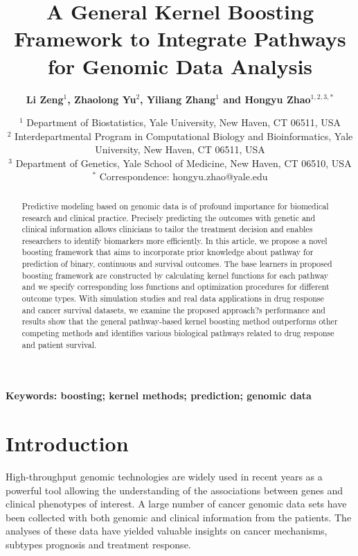 \documentclass[a4paper,12pt]{article}
\begin{document}
	\title{\bf A General Kernel Boosting Framework to Integrate Pathways for Genomic Data Analysis}
	\author{\bf Li Zeng$^{1}$, Zhaolong Yu$^2$, Yiliang Zhang$^1$ and Hongyu Zhao$^{1,2,3,*}$}
	\date{
		$^1$ Department of Biostatistics, Yale University, New Haven, CT 06511, USA\\
	$^2$ Interdepartmental Program in Computational Biology and Bioinformatics, Yale University, New Haven, CT 06511, USA\\
	$^3$ Department of Genetics, Yale School of Medicine, New Haven, CT 06510, USA\\
	$^*$ Correspondence: hongyu.zhao@yale.edu
}
	\maketitle
	\begin{abstract}
	Predictive modeling based on genomic data is of profound importance for biomedical research and clinical practice. Precisely predicting the outcomes with genetic and clinical information allows clinicians to tailor the treatment decision and enables researchers to identify biomarkers more efficiently. In this article, we propose a novel boosting framework that aims to incorporate prior knowledge about pathway for prediction of binary, continuous and survival outcomes. The base learners in proposed boosting framework are constructed by calculating kernel functions for each pathway and we specify corresponding loss functions and optimization procedures for different outcome types. With simulation studies and real data applications in drug response and cancer survival datasets, we examine the proposed approach?s performance and results show that the general pathway-based kernel boosting method outperforms other competing methods and identifies various biological pathways related to drug response and patient survival.
		\end{abstract}

		\begin{center}
			\textbf{Keywords: boosting; kernel methods; prediction; genomic data}
			\end{center}

	

	\section{Introduction}
	High-throughput genomic technologies are widely used in recent years as a powerful tool allowing the understanding of the associations between genes and clinical phenotypes of interest. A large number of cancer genomic data sets have been collected with both genomic and clinical information from the patients. The analyses of these data have yielded valuable insights on cancer mechanisms, subtypes prognosis and treatment response. 
	
\end{document}
